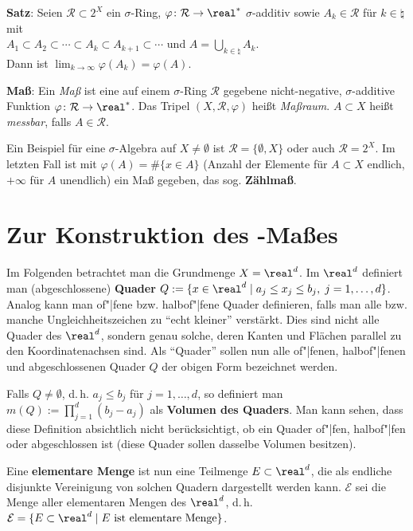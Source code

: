 \textbf{Satz}:
Seien $\mathcal{R} \subset 2^X$ ein $\sigma$-Ring,
$\varphi\colon \mathcal{R} \rightarrow \real^\ast$ $\sigma$-additiv sowie
$A_k \in \mathcal{R}$ für $k \in \natural$ mit \\
$A_1 \subset A_2 \subset \dotsb \subset A_k \subset A_{k+1} \subset \dotsb$
und $A = \bigcup_{k \in \natural} A_k$. \\
Dann ist $\lim_{k \to \infty} \varphi(A_k) = \varphi(A)$.

\linie

\textbf{Maß}:
Ein \emph{Maß} ist eine auf einem $\sigma$-Ring $\mathcal{R}$ gegebene
nicht-negative, $\sigma$-additive Funktion
$\varphi\colon \mathcal{R} \rightarrow \real^\ast$.
Das Tripel $(X, \mathcal{R}, \varphi)$ heißt \emph{Maßraum}.
$A \subset X$ heißt \emph{messbar}, falls $A \in \mathcal{R}$.

Ein Beispiel für eine $\sigma$-Algebra auf $X \not= \emptyset$ ist
$\mathcal{R} = \{\emptyset, X\}$ oder auch $\mathcal{R} = 2^X$.
Im letzten Fall ist mit $\varphi(A) = \#\{x \in A\}$ (Anzahl der Elemente für
$A \subset X$ endlich, $+\infty$ für $A$ unendlich) ein Maß gegeben, das sog.
\textbf{Zählmaß}.

\section{%
    Zur Konstruktion des -Maßes%
}

Im Folgenden betrachtet man die Grundmenge $X = \real^d$.
Im $\real^d$ definiert man (abgeschlossene) \textbf{Quader}
$Q := \{x \in \real^d \;|\; a_j \le x_j \le b_j,\; j = 1, \dotsc, d\}$.
Analog kann man of"|fene bzw. halb\-of"|fene Quader definieren, falls man alle
bzw. manche Ungleichheitszeichen zu "`echt kleiner"' verstärkt.
Dies sind nicht alle Quader des $\real^d$, sondern genau solche, deren Kanten
und Flächen parallel zu den Koordinatenachsen sind.
Als "`Quader"' sollen nun alle of"|fenen, halbof"|fenen und abgeschlossenen
Quader $Q$ der obigen Form bezeichnet werden.

Falls $Q \not= \emptyset$, d.\,h. $a_j \le b_j$ für $j = 1, \dotsc, d$, so
definiert man $m(Q) := \prod_{j=1}^d (b_j - a_j)$
als \textbf{Volumen des Quaders}.
Man kann sehen, dass diese Definition absichtlich nicht berücksichtigt, ob
ein Quader of"|fen, halbof"|fen oder abgeschlossen ist
(diese Quader sollen dasselbe Volumen besitzen).

Eine \textbf{elementare Menge} ist nun eine Teilmenge $E \subset \real^d$,
die als endliche disjunkte Vereinigung von solchen Quadern dargestellt werden
kann.
$\mathcal{E}$ sei die Menge aller elementaren Mengen des $\real^d$, d.\,h.
$\mathcal{E} = \{E \subset \real^d \;|\; E \text{ ist elementare Menge}\}$.

